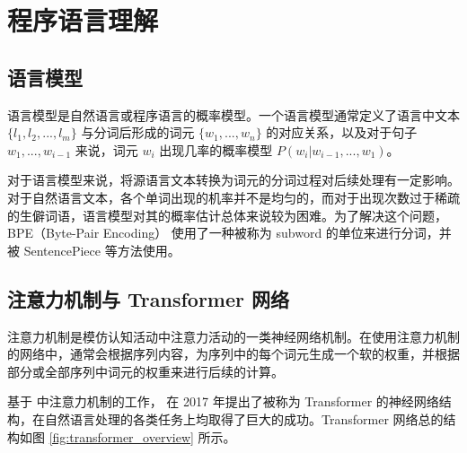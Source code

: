 \section{程序语言理解}

\label{sec:pl_understanding}

\subsection{语言模型}

\label{sec:language_model}

语言模型是自然语言或程序语言的概率模型。一个语言模型通常定义了语言中文本 $\{l_1, l_2, ..., l_m\}$ 与分词后形成的词元 $\{w_1, ..., w_n\}$ 的对应关系，以及对于句子 $ w_1, ..., w_{i-1} $ 来说，词元 $ w_i$ 出现几率的概率模型 $P(w_i|w_{i-1}, ..., w_{1})
$。


对于语言模型来说，将源语言文本转换为词元的分词过程对后续处理有一定影响。对于自然语言文本，各个单词出现的机率并不是均匀的，而对于出现次数过于稀疏的生僻词语，语言模型对其的概率估计总体来说较为困难。为了解决这个问题，BPE（Byte-Pair Encoding）\cite{sennrich-etal-2016-neural} 使用了一种被称为 subword 的单位来进行分词，并被 SentencePiece \cite{kudo-richardson-2018-sentencepiece} 等方法使用。

\subsection{注意力机制与 Transformer 网络}

注意力机制是模仿认知活动中注意力活动的一类神经网络机制。在使用注意力机制的网络中，通常会根据序列内容，为序列中的每个词元生成一个软的权重，并根据部分或全部序列中词元的权重来进行后续的计算。

基于 \citet{bahdanau2016neural} 中注意力机制的工作，\citet{Vaswani2017AttentionIA} 在 2017 年提出了被称为 Transformer 的神经网络结构，在自然语言处理的各类任务上均取得了巨大的成功。Transformer 网络总的结构如图 \ref{fig:transformer_overview} 所示。

